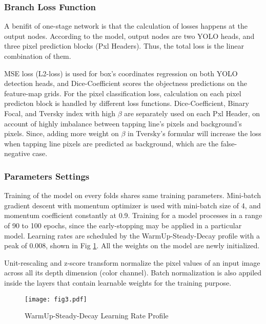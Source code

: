 \documentclass[default,pdflatex,iicol]{sn-jnl}%
\begin{document}
\subsubsection{Branch Loss Function}\label{subsubsec-pxlbranch}
A benifit of one-stage network is that the calculation of losses happens at the output nodes. According to the model, output nodes are two YOLO heads, and three pixel prediction blocks (Pxl Headers). Thus, the total loss is the linear combination of them.

MSE loss (L2-loss) is used for box's coordinates regression on both YOLO detection heads, and Dice-Coefficient scores the objectness predictions on the feature-map grids. For the pixel classification loss, calculation on each pixel predicton block is handled by different loss functions. Dice-Coefficient, Binary Focal, and Tversky index with high $\beta$  are separately used on each Pxl Header, on account of highly imbalance between tapping line's pixels and background's pixels. Since, adding more weight on $\beta$ in Tversky's formular \cite{tverskyloss} will increase the loss when tapping line pixels are predicted as background, which are the false-negative case.

\subsubsection{Parameters Settings}\label{subsubsec-trainingparams}
Training of the model on every folds shares same training parameters. Mini-batch gradient descent with momentum optimizer is used with mini-batch size of 4, and momentum coefficient constantly at 0.9. Training for a model processes in a range of 90 to 100 epochs, since the early-stopping may be applied in a particular model. Learning rates are scheduled by the WarmUp-Steady-Decay profile with a peak of 0.008, shown in Fig \ref{fig3-LR}. All the weights on the model are newly initialized. 

Unit-rescaling and z-score transform normalize the pixel values of an input image across all its depth dimension (color channel). Batch normalization is also appiled inside the layers that contain learnable weights for the training purpose.

\begin{figure}[h]%
\centering
\texttt{[image: fig3.pdf]}
\caption{WarmUp-Steady-Decay Learning Rate Profile}\label{fig3-LR}
\end{figure}
\end{document}
